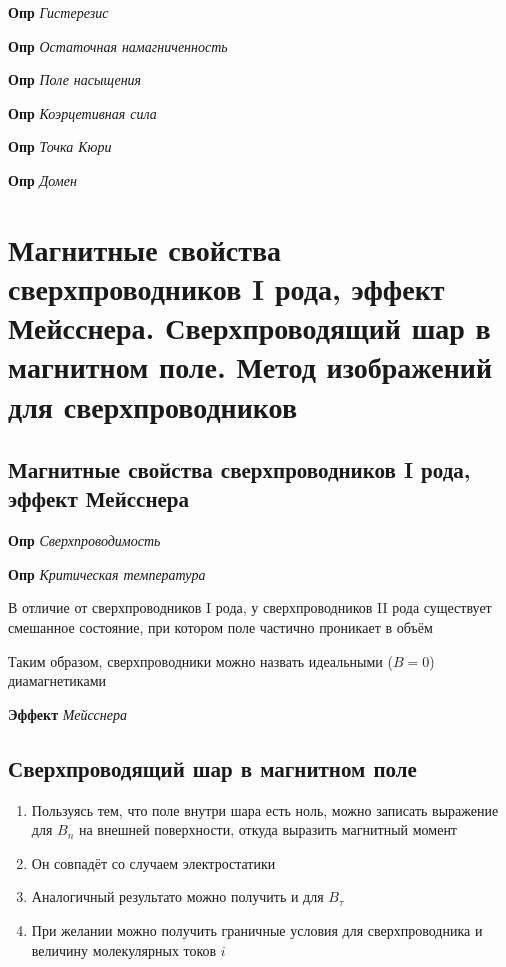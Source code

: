 \documentclass[a4paper, 14pt]{article}
\begin{document}
    \textbf{Опр} \textit{Гистерезис}
    
    \textbf{Опр} \textit{Остаточная намагниченность}
    
    \textbf{Опр} \textit{Поле насыщения}
    
    \textbf{Опр} \textit{Коэрцетивная сила}
    
    \textbf{Опр} \textit{Точка Кюри}
    
    \textbf{Опр} \textit{Домен}
    
    \section{Магнитные свойства сверхпроводников I рода, эффект Мейсснера.
    Сверхпроводящий шар в магнитном поле.
    Метод изображений для сверхпроводников}
    
    \subsection{Магнитные свойства сверхпроводников I рода, эффект Мейсснера}
    
    \textbf{Опр} \textit{Сверхпроводимость}
    
    \textbf{Опр} \textit{Критическая температура}
    
    В отличие от сверхпроводников I рода, у сверхпроводников II рода существует смешанное состояние, при котором поле
    частично проникает в объём
    
    Таким образом, сверхпроводники можно назвать идеальными ($B = 0$) диамагнетиками
    
    \textbf{Эффект} \textit{Мейсснера}
    
    \subsection{Сверхпроводящий шар в магнитном поле}
    
    \begin{enumerate}
        \item Пользуясь тем, что поле внутри шара есть ноль, можно записать выражение для $B_n$ на внешней
        поверхности, откуда выразить магнитный момент
        \item Он совпадёт со случаем электростатики
        \item Аналогичный результато можно получить и для $B_\tau$
        \item При желании можно получить граничные условия для сверхпроводника и величину молекулярных токов $i$
    \end{enumerate}
    
\end{document}
